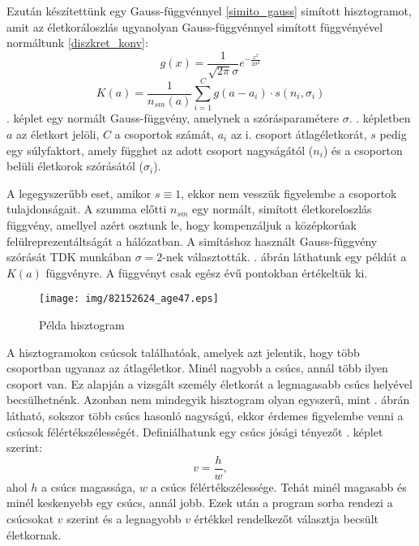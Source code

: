 \documentclass[12pt]{article}
\begin{document}
Ezután készítettünk egy Gauss-függvénnyel \eqref{simito_gauss} simított hisztogramot, amit az életkoráloszlás ugyanolyan Gauss-függvénnyel simított függvényével normáltunk \eqref{diszkret_konv}:
\begin{equation} \label{simito_gauss}
	g(x) = \frac{1}{\sqrt{2\pi}\sigma}e^{-\frac{x^2}{2\sigma^2}}
\end{equation}
\begin{equation} \label{diszkret_konv}
	K(a) = \frac{1}{n_{sm}(a)}\sum_{i=1}^{C} g(a-a_i) \cdot s(n_{i}, \sigma_{i}) %
\end{equation} %
. képlet egy normált Gauss-függvény, amelynek a szórásparamétere $\sigma$. . képletben $a$ az életkort jelöli, $C$ a csoportok számát, $a_i$ az i. csoport átlagéletkorát, $s$ pedig egy súlyfaktort, amely függhet az adott csoport nagyságától ($n_{i}$) és a csoporton belüli életkorok szórásától ($\sigma_i$).

A legegyszerűbb eset, amikor $s\equiv 1$, ekkor nem vesszük figyelembe a csoportok tulajdonságait.
A szumma előtti $n_{sm}$ egy normált, simított életkoreloszlás függvény, amellyel azért osztunk le, hogy kompenzáljuk a középkorúak felülreprezentáltságát a hálózatban.
A simításhoz használt Gauss-függvény szórását  TDK munkában $\sigma=2$-nek választották. \iffalse TODO: ez lehet nem túl világos \fi {}. ábrán láthatunk egy példát a $K(a)$ függvényre. A függvényt csak egész évű pontokban értékeltük ki.
\begin{figure}[H]
	\centering
	\texttt{[image: img/82152624\_age47.eps]}
	\caption{Példa hisztogram} %
	\label{hisztogram_pelda}
\end{figure}
A hisztogramokon csúcsok találhatóak, amelyek azt jelentik, hogy több csoportban ugyanaz az átlagéletkor. Minél nagyobb a csúcs, annál több ilyen csoport van. Ez alapján a vizsgált személy életkorát a legmagasabb csúcs helyével becsülhetnénk. Azonban nem mindegyik hisztogram olyan egyszerű, mint . ábrán látható, sokszor több csúcs hasonló nagyságú, ekkor érdemes figyelembe venni a csúcsok félértékszélességét. Definiálhatunk egy csúcs jósági tényezőt . képlet szerint:
\begin{equation} \label{csucs_josag}
	v = \frac{h}{w},
\end{equation}
ahol $h$ a csúcs magassága, $w$ a csúcs félértékszélessége. Tehát minél magasabb és minél keskenyebb egy csúcs, annál jobb. Ezek után a program sorba rendezi a csúcsokat $v$ szerint és a legnagyobb $v$ értékkel rendelkezőt választja becsült életkornak.
\end{document}
